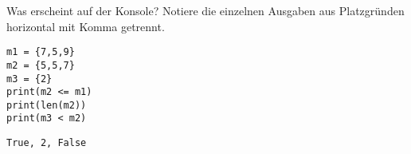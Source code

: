 \question[3] Was erscheint auf der Konsole?
 Notiere die einzelnen Ausgaben aus Platzgründen horizontal mit Komma getrennt.
\begin{lstlisting}
m1 = {7,5,9}
m2 = {5,5,7}
m3 = {2}
print(m2 <= m1)
print(len(m2))
print(m3 < m2)
\end{lstlisting}
\begin{solutionbox}{2cm}
\texttt{True, 2, False}
\end{solutionbox}

